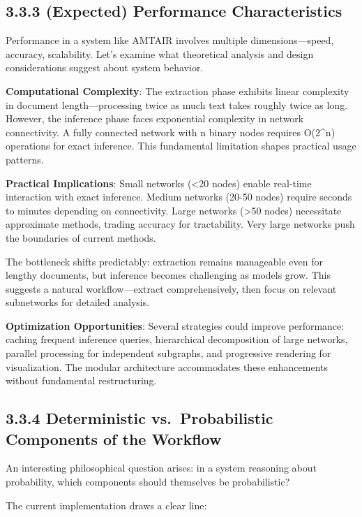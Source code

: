 \documentclass[
  11pt,
  letterpaper,
]{book}
\begin{document}
\subsection{3.3.3 (Expected) Performance
Characteristics}\label{sec-performance}

Performance in a system like AMTAIR involves multiple
dimensions---speed, accuracy, scalability. Let's examine what
theoretical analysis and design considerations suggest about system
behavior.

\textbf{Computational Complexity}: The extraction phase exhibits linear
complexity in document length---processing twice as much text takes
roughly twice as long. However, the inference phase faces exponential
complexity in network connectivity. A fully connected network with n
binary nodes requires O(2\^{}n) operations for exact inference. This
fundamental limitation shapes practical usage patterns.

\textbf{Practical Implications}: Small networks (\textless20 nodes)
enable real-time interaction with exact inference. Medium networks
(20-50 nodes) require seconds to minutes depending on connectivity.
Large networks (\textgreater50 nodes) necessitate approximate methods,
trading accuracy for tractability. Very large networks push the
boundaries of current methods.

The bottleneck shifts predictably: extraction remains manageable even
for lengthy documents, but inference becomes challenging as models grow.
This suggests a natural workflow---extract comprehensively, then focus
on relevant subnetworks for detailed analysis.

\textbf{Optimization Opportunities}: Several strategies could improve
performance: caching frequent inference queries, hierarchical
decomposition of large networks, parallel processing for independent
subgraphs, and progressive rendering for visualization. The modular
architecture accommodates these enhancements without fundamental
restructuring.

\subsection{3.3.4 Deterministic vs.~Probabilistic Components of the
Workflow}\label{sec-deterministic-probabilistic}

An interesting philosophical question arises: in a system reasoning
about probability, which components should themselves be probabilistic?

The current implementation draws a clear line:
\end{document}
